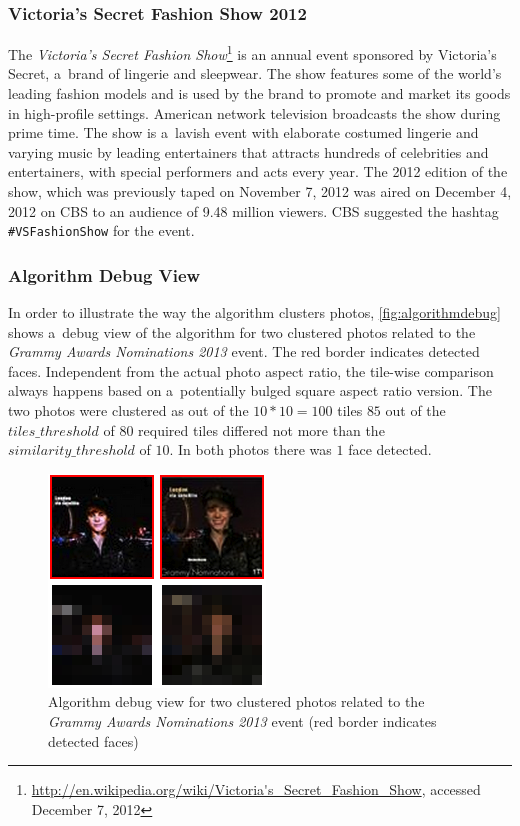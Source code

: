 \subsubsection{Victoria's Secret Fashion Show 2012}

The \emph{Victoria's Secret Fashion
Show}\footnote{\url{http://en.wikipedia.org/wiki/Victoria's_Secret_Fashion_Show},
accessed December 7, 2012} is an annual event
sponsored by Victoria's Secret, a~brand of lingerie and sleepwear.
The show features some of the world's leading fashion models
and is used by the brand to promote and market its goods in high-profile settings.
American network television broadcasts the show during prime time.
The show is a~lavish event with elaborate costumed lingerie and
varying music by leading entertainers
that attracts hundreds of celebrities and entertainers,
with special performers and acts every year.
The 2012 edition of the show,
which was previously taped on November 7, 2012
was aired on December 4, 2012 on CBS
to an audience of 9.48 million viewers.
CBS suggested the hashtag \texttt{\#VSFashionShow} for the event.

\subsubsection{Algorithm Debug View}

In order to illustrate the way the algorithm clusters photos,
\autoref{fig:algorithmdebug} shows a~debug view of the algorithm
for two clustered photos related to the 
\emph{Grammy Awards Nominations 2013} event.
The red border indicates detected faces.
Independent from the actual photo aspect ratio,
the tile-wise comparison always happens based on a~potentially bulged
square aspect ratio version.
The two photos were clustered as out of the $10 * 10 = 100$ tiles
$85$ out of the $tiles\_threshold$ of $80$ required tiles
differed not more than the $similarity\_threshold$ of $10$.
In both photos there was $1$ face detected.

\begin{figure}[h!]
  \centering
  \includegraphics[width=0.4\linewidth]{./algorithmdebug.png}
  \caption[Algorithm debug view for two clustered photos]
  {Algorithm debug view for two clustered photos related to the \emph{Grammy Awards Nominations 2013} event (red border indicates detected faces)}
  \label{fig:algorithmdebug}
\end{figure}

